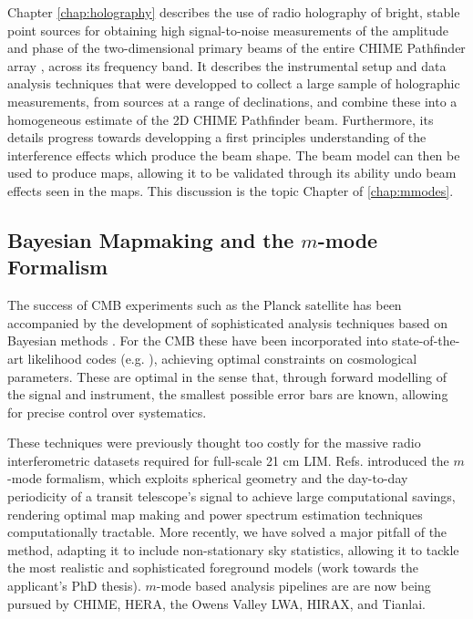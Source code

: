 Chapter \ref{chap:holography} describes the use of radio holography of bright, stable point sources for obtaining high signal-to-noise measurements of the amplitude and phase of the two-dimensional primary beams of the entire CHIME Pathfinder array \citep{chimepath1}, across its frequency band. It describes the instrumental setup and data analysis techniques that were developped to collect a large sample of holographic measurements, from sources at a range of declinations, and combine these into a homogeneous estimate of the 2D CHIME Pathfinder beam. Furthermore, its details progress towards developping a first principles understanding of the interference effects which produce the beam shape. The beam model can then be used to produce maps, allowing it to be validated through its ability undo beam effects seen in the maps. This discussion is the topic Chapter of \ref{chap:mmodes}.

\subsection{\label{sec:bg:subsec:mmodes} Bayesian Mapmaking and the $m$-mode Formalism}

The success of CMB experiments such as the Planck satellite has been accompanied by the development of sophisticated analysis techniques based on Bayesian methods \citep{bondjaffeknox}. For the CMB these have been incorporated into state-of-the-art likelihood codes (e.g. \citep{commander}), achieving optimal constraints on cosmological parameters. These are optimal in the sense that, through forward modelling of the signal and instrument, the smallest possible error bars are known, allowing for precise control over systematics.

These techniques were previously thought too costly for the massive radio interferometric datasets required for full-scale 21 cm LIM. Refs. \citep{mmodes1, mmodes2} introduced the $m$-mode formalism, which exploits spherical geometry and the day-to-day periodicity of a transit telescope's signal to achieve large computational savings, rendering optimal map making and power spectrum estimation techniques computationally tractable. More recently, we have solved a major pitfall of the method, adapting it to include non-stationary sky statistics, allowing it to tackle the most realistic and sophisticated foreground models \citep{bergeroppermann} (work towards the applicant's PhD thesis). $m$-mode based analysis pipelines are are now being pursued by CHIME, HERA, the Owens Valley LWA, HIRAX, and Tianlai.